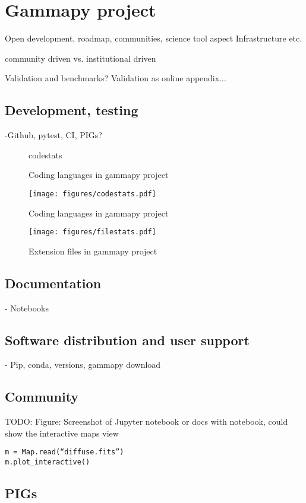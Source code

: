 \section{Gammapy project}
\label{sec:gammapy-project}

Open development, roadmap, communities, science tool aspect Infrastructure etc.

community driven vs. institutional driven

Validation and benchmarks? Validation as online appendix...

\subsection{Development, testing}
\label{ssec:development-testing}
-Github, pytest, CI, PIGs?

\begin{figure}
	{codestats}
	\caption{Coding languages in gammapy project}
	\label{codestats:data}
\end{figure}

\begin{figure}[t]
	\centering
	\texttt{[image: figures/codestats.pdf]}
    \caption{
        Coding languages in gammapy project
    }
	\label{fig:codestats:lang}
\end{figure}

\begin{figure}[t]
	\centering
	\texttt{[image: figures/filestats.pdf]}
    \caption{
        Extension files in gammapy project
    }
	\label{fig:codestats:file}
\end{figure}

\subsection{Documentation}
\label{ssec:documentation}

- Notebooks

\subsection{Software distribution and user support}
\label{ssec:software-distribution-and-user-support}
- Pip, conda, versions, gammapy download

\subsection{Community}
\label{ssec:community}
TODO: Figure: Screenshot of Jupyter notebook or docs with notebook, could show
the interactive maps view
\begin{verbatim}
m = Map.read(“diffuse.fits”)
m.plot_interactive()
\end{verbatim}

\subsection{PIGs}
\label{ssec:pigs}
